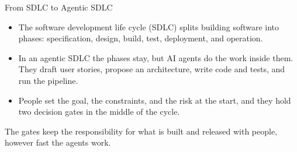 \documentclass[aspectratio=169, table, 12pt]{beamer}
\begin{document}
\begin{frame}{{\Large From SDLC to Agentic SDLC}}
  \vspace{10pt}
  \begin{itemize}
    \item The software development life cycle (SDLC) splits building software
          into phases: specification, design, build, test, deployment, and
          operation.
    \item In an agentic SDLC the phases stay, but AI agents do the work inside
          them. They draft user stories, propose an architecture, write code
          and tests, and run the pipeline.
    \item People set the goal, the constraints, and the risk at the start, and
          they hold two decision gates in the middle of the cycle.
  \end{itemize}
  \vspace{6pt}
  {\small The gates keep the responsibility for what is built and released
  with people, however fast the agents work.}
\end{frame}
\end{document}
